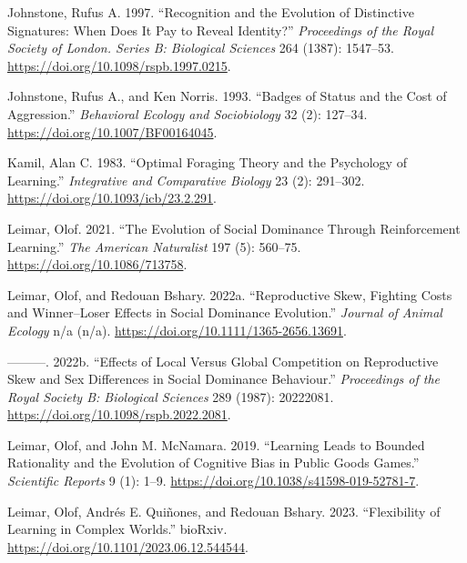 \documentclass[
  12pt,
]{article}
\newlength{\cslhangindent}
\newlength{\cslentryspacingunit} %
\newenvironment{CSLReferences}[2] %
 {%
  \setlength{\parindent}{0pt}
  \ifodd #1
  \let\oldpar\par
  \def\par{\hangindent=\cslhangindent\oldpar}
  \fi
  \setlength{\parskip}{#2\cslentryspacingunit}
 }%
 {}
\begin{document}
\begin{CSLReferences}{1}{0}
\leavevmode{}%
Johnstone, Rufus A. 1997. {``Recognition and the Evolution of
Distinctive Signatures: When Does It Pay to Reveal Identity?''}
\emph{Proceedings of the Royal Society of London. Series B: Biological
Sciences} 264 (1387): 1547--53.
\url{https://doi.org/10.1098/rspb.1997.0215}.

\leavevmode{}%
Johnstone, Rufus A., and Ken Norris. 1993. {``Badges of Status and the
Cost of Aggression.''} \emph{Behavioral Ecology and Sociobiology} 32
(2): 127--34. \url{https://doi.org/10.1007/BF00164045}.

\leavevmode{}%
Kamil, Alan C. 1983. {``Optimal {Foraging} {Theory} and the {Psychology}
of {Learning}.''} \emph{Integrative and Comparative Biology} 23 (2):
291--302. \url{https://doi.org/10.1093/icb/23.2.291}.

\leavevmode{}%
Leimar, Olof. 2021. {``The {Evolution} of {Social} {Dominance} Through
{Reinforcement} {Learning}.''} \emph{The American Naturalist} 197 (5):
560--75. \url{https://doi.org/10.1086/713758}.

\leavevmode{}%
Leimar, Olof, and Redouan Bshary. 2022a. {``Reproductive Skew, Fighting
Costs and Winner--Loser Effects in Social Dominance Evolution.''}
\emph{Journal of Animal Ecology} n/a (n/a).
\url{https://doi.org/10.1111/1365-2656.13691}.

\leavevmode{}%
---------. 2022b. {``Effects of Local Versus Global Competition on
Reproductive Skew and Sex Differences in Social Dominance Behaviour.''}
\emph{Proceedings of the Royal Society B: Biological Sciences} 289
(1987): 20222081. \url{https://doi.org/10.1098/rspb.2022.2081}.

\leavevmode{}%
Leimar, Olof, and John M. McNamara. 2019. {``Learning Leads to Bounded
Rationality and the Evolution of Cognitive Bias in Public Goods
Games.''} \emph{Scientific Reports} 9 (1): 1--9.
\url{https://doi.org/10.1038/s41598-019-52781-7}.

\leavevmode{}%
Leimar, Olof, Andrés E. Quiñones, and Redouan Bshary. 2023.
{``Flexibility of Learning in Complex Worlds.''} bioRxiv.
\url{https://doi.org/10.1101/2023.06.12.544544}.


\end{CSLReferences}
\end{document}

